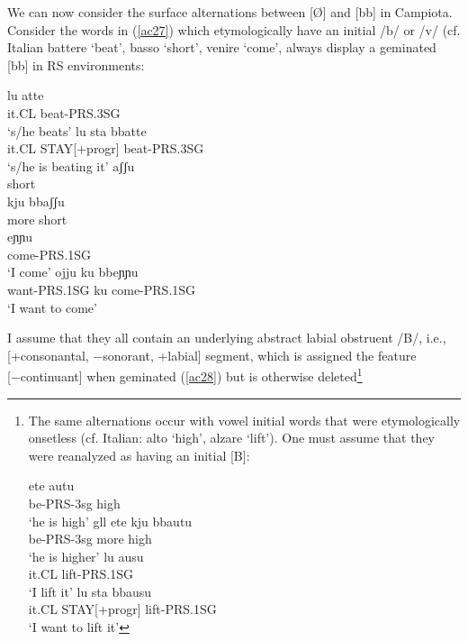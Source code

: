 \documentclass[output=paper]{langscibook}
\begin{document}
We can now consider the surface alternations between [Ø] and [bb] in Campiota.  Consider the words in (\ref{ac27}) which etymologically have an initial /b/ or /v/ (cf. Italian battere ‘beat’, basso ‘short’, venire ‘come’, always display a geminated [bb] in RS environments:

\ea\label{ac27}
    \ea\label{ac27a}
        \ea \label{ac27ai}\gll lu atte\\
            it.CL beat-PRS.3SG\\  
            \glt `s/he beats'  
        \ex \label{ac27aii}\gll lu   sta     bbatte\\
            it.CL STAY[+progr] beat-PRS.3SG\\
            \glt `s/he is beating it'
        \z
    \ex\label{ac27b}
        \ea \label{ac27bi}\gll aʃʃu\\
                short\\
        \ex \label{ac27bii}\gll kju     bbaʃʃu\\
                more    short\\
        \z
    \ex\label{ac27c}
        \ea \label{ac27ci}\gll eɲɲu\\
            come-PRS.1SG\\ 
            \glt `I come'   
        \ex \label{ac27cii}\gll ojju      ku   bbeɲɲu\\
            want-PRS.1SG ku   come-PRS.1SG\\
            \glt `I want to come' 
        \z
    \z
\z

I assume that they all contain an underlying abstract labial obstruent /B/, i.e., [+consonantal, −sonorant, +labial] segment, which is assigned the feature [−continuant] when geminated (\ref{ac28}) but is otherwise deleted\footnote{The same alternations occur with vowel initial words that were etymologically onsetless (cf. Italian: alto `high', alzare `lift').  One must assume that they were reanalyzed as having an initial [B]:

\ea \label{fn14ex}
    \ea \label{fn14exa}
        \ea \label{fn14exai}\gll ete autu\\
            be-PRS-3sg high\\
            \glt ‘he is high’    
        \ex \label{fn14exaii}gll ete kju bbautu\\
            be-PRS-3sg more high\\
            \glt ‘he is higher’
        \z
    \ex \label{fn14exb}
        \ea \label{fn14exbi}\gll lu ausu\\
            it.CL lift-PRS.1SG\\
            \glt ‘I lift it’  
        \ex \label{fn14exbii}\gll lu sta bbausu\\
            it.CL STAY[+progr]  lift-PRS.1SG\\
            \glt ‘I want to lift it’
        \z
    \z
\z

}
\end{document}
